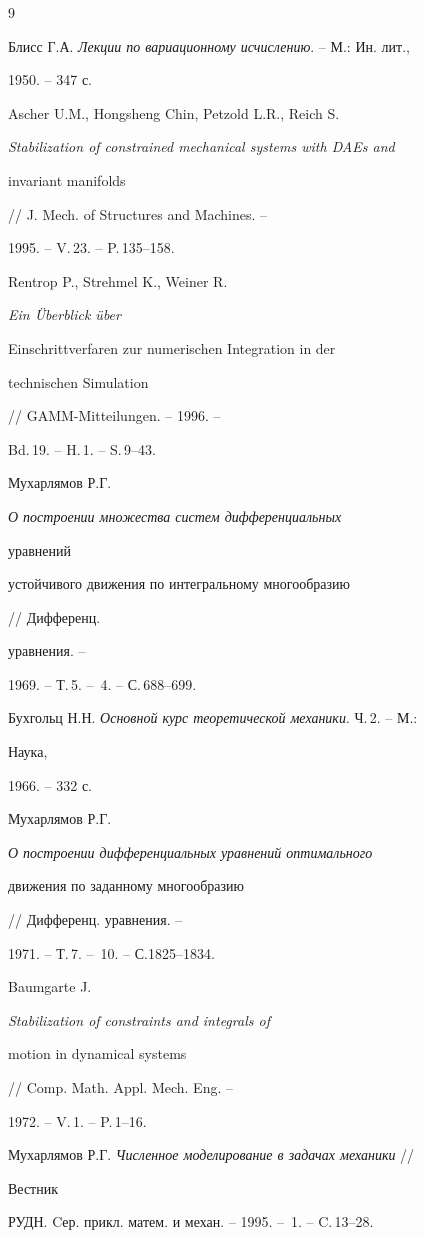 \begin{thebibliography}{9} 


 




Блисс Г.А. {\em Лекции по вариационному исчислению}. -- М.: Ин. лит., 


1950. -- 347 с. 




Ascher U.M., Hongsheng Chin, Petzold L.R., Reich S. 


{\em Stabilization of constrained mechanical systems with DAEs and 


invariant manifolds} // J. Mech. of Structures and Machines. -- 


1995. -- V.\,23. -- P.\,135--158. 




Rentrop P., Strehmel K., Weiner R. {\em Ein \"Uberblick \"uber 


Einschrittverfaren zur numerischen Integration in der 


technischen Simulation} // GAMM-Mitteilungen. -- 1996. -- 


Bd.\,19. -- H.\,1. -- S.\,9--43. 




Мухарлямов Р.Г. {\em О построении множества систем дифференциальных 


уравнений 


устойчивого движения по интегральному многообразию} // Дифференц. 


уравнения. --


1969. -- Т.\,5. -- \No\,4. -- С.\,688--699. 




Бухгольц Н.Н. {\em Основной курс теоретической механики}. Ч.\,2. -- М.: 


Наука, 


1966. -- 332 с. 




Мухарлямов Р.Г. {\em О построении дифференциальных уравнений оптимального 


движения по заданному многообразию} // Дифференц. уравнения. -- 


1971. -- Т.\,7. -- \No\,10. -- С.1825--1834. 




Baumgarte J. {\em Stabilization of constraints and integrals of 


motion in dynamical systems} // Comp. Math. Appl. Mech. Eng. -- 


1972. -- V.\,1. -- P.\,1--16. 




Мухарлямов Р.Г. {\em Численное моделирование в задачах механики} // 


Вестник 


РУДН. Cер. прикл. матем. и механ. -- 1995. -- \No\,1. -- C.\,13--28. 


 


\end{thebibliography} 


